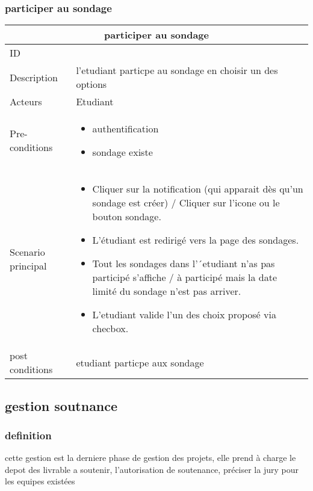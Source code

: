 \documentclass[11pt,fleqn]{book} %
\begin{document}
\subsubsection{participer au sondage}
\begin{center}
\begin{tabularx}{1\textwidth} { | p{4cm} | >{\raggedright\arraybackslash}X |  }
  \hline
  \multicolumn{2}{|c|}{participer au sondage} \\
 \hline
 ID & 5  \\
 \hline
 Description  & l'etudiant particpe au sondage en choisir un des options   \\
  \hline
 Acteurs  & Etudiant   \\
  \hline
 Pre-conditions  & \begin{itemize}
     \item authentification
     \item sondage existe
 \end{itemize}\\
 \hline
 Scenario principal  &  
 \begin{itemize}
     \item  Cliquer sur la notification (qui apparait dès qu’un sondage est créer) / Cliquer sur l’icone ou le bouton sondage.
     \item L’étudiant est redirigé vers la page des sondages.
     \item Tout les sondages dans l’´etudiant n’as pas participé s’affiche / à participé mais la date limité du sondage n’est pas arriver.
     \item L’etudiant valide l’un des choix proposé via checbox.

 \end{itemize}\\
  \hline
 post conditions  & etudiant particpe aux sondage \\
  \hline
\end{tabularx}
\label{tbl:nicetablelesstable}
\end{center}
\newpage
\subsection{gestion soutnance} 

\subsubsection{definition}
cette gestion est la derniere phase de gestion des projets, elle prend à charge le depot des livrable a soutenir, l'autorisation de soutenance, préciser la jury pour les equipes existées
\end{document}
